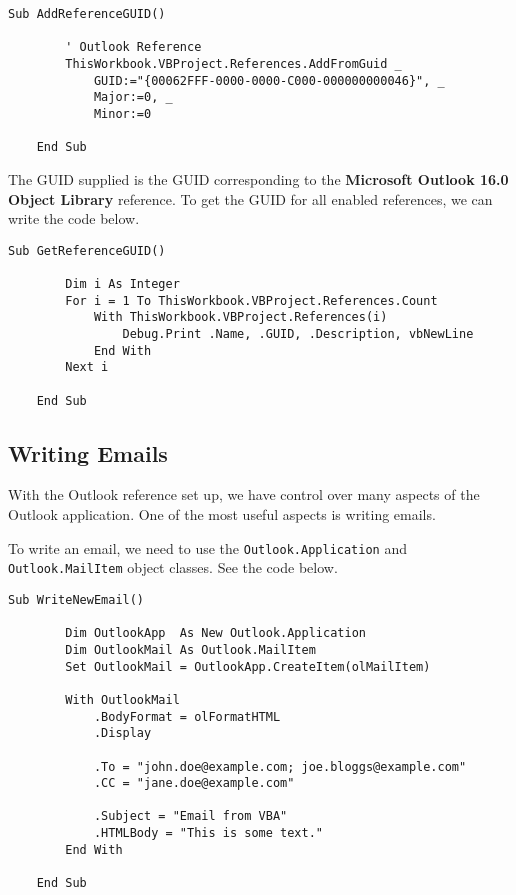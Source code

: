 \documentclass[11pt]{article}%
\begin{document}
\begin{lstlisting}[style=A]
    Sub AddReferenceGUID()

        ' Outlook Reference
        ThisWorkbook.VBProject.References.AddFromGuid _
            GUID:="{00062FFF-0000-0000-C000-000000000046}", _
            Major:=0, _
            Minor:=0

    End Sub
\end{lstlisting}

The GUID supplied is the GUID corresponding to the \textbf{Microsoft Outlook 16.0 Object Library} reference. To get the GUID for all enabled references, we can write the code below.\\

\begin{lstlisting}[style=A]
    Sub GetReferenceGUID()

        Dim i As Integer
        For i = 1 To ThisWorkbook.VBProject.References.Count
            With ThisWorkbook.VBProject.References(i)
                Debug.Print .Name, .GUID, .Description, vbNewLine
            End With
        Next i

    End Sub
\end{lstlisting}



\subsection{Writing Emails}\label{subsec:WritingEmails}

With the Outlook reference set up, we have control over many aspects of the Outlook application. One of the most useful aspects is writing emails.

To write an email, we need to use the \texttt{Outlook.Application} and \texttt{Outlook.MailItem} object classes. See the code below.\\

\begin{lstlisting}[style=A]
    Sub WriteNewEmail()

        Dim OutlookApp  As New Outlook.Application
        Dim OutlookMail As Outlook.MailItem
        Set OutlookMail = OutlookApp.CreateItem(olMailItem)

        With OutlookMail
            .BodyFormat = olFormatHTML
            .Display

            .To = "john.doe@example.com; joe.bloggs@example.com"
            .CC = "jane.doe@example.com"

            .Subject = "Email from VBA"
            .HTMLBody = "This is some text."
        End With

    End Sub
\end{lstlisting}
\end{document}
